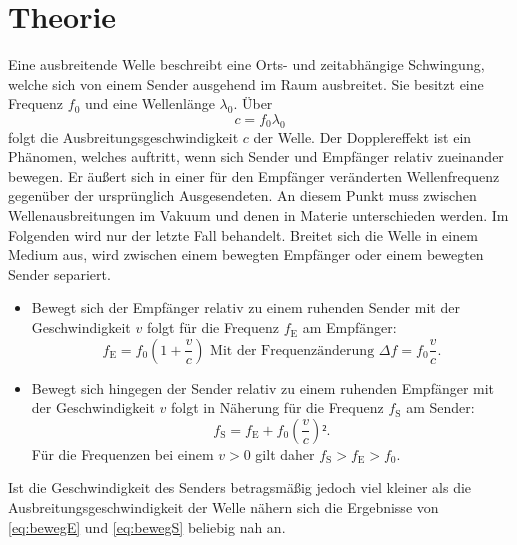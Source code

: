 
\section{Theorie}
\label{sec:Theorie}
Eine ausbreitende Welle beschreibt eine Orts- und zeitabhängige Schwingung,
 welche sich von einem Sender ausgehend im Raum ausbreitet. Sie besitzt eine Frequenz $f_0$ und eine Wellenlänge $\lambda_0$. Über
 \begin{equation}
   c = f_0 \lambda_0 \label{eq:c}
   \end{equation}
   folgt die Ausbreitungsgeschwindigkeit $c$ der Welle.
Der Dopplereffekt ist ein Phänomen, welches auftritt,
 wenn sich Sender und Empfänger relativ zueinander bewegen. Er äußert sich in
  einer für den Empfänger veränderten Wellenfrequenz gegenüber der ursprünglich
   Ausgesendeten. An diesem Punkt muss zwischen Wellenausbreitungen im Vakuum
    und denen in Materie unterschieden werden. Im Folgenden wird nur der letzte
     Fall behandelt. Breitet sich die Welle in einem
     Medium aus, wird zwischen einem bewegten Empfänger oder einem bewegten
      Sender separiert.
\begin{itemize}
\item Bewegt sich der Empfänger relativ zu einem ruhenden Sender mit der
 Geschwindigkeit $v$ folgt für die Frequenz $f_\text{E}$ am Empfänger:
 \begin{equation}
   f_\text{E} = f_0\left(1+\frac{v}{c}\right) \text{ Mit der Frequenzänderung }\Delta f = f_0\frac{v}{c}\text{.}\label{eq:bewegE}
   \end{equation}
   \item Bewegt sich hingegen der Sender relativ zu einem ruhenden Empfänger mit der
    Geschwindigkeit $v$ folgt in Näherung für die Frequenz $f_\text{S}$ am Sender:
    \begin{equation}
      f_\text{S} = f_\text{E} + f_0\left(\frac{v}{c}\right)²\text{.}\label{eq:bewegS}
      \end{equation}
      Für die Frequenzen bei einem $v > 0$ gilt daher $f_\text{S} > f_\text{E} > f_0$.
\end{itemize}
Ist die Geschwindigkeit des Senders betragsmäßig jedoch viel kleiner als
 die Ausbreitungsgeschwindigkeit der Welle nähern sich die Ergebnisse von
  \eqref{eq:bewegE} und \eqref{eq:bewegS} beliebig nah an.
